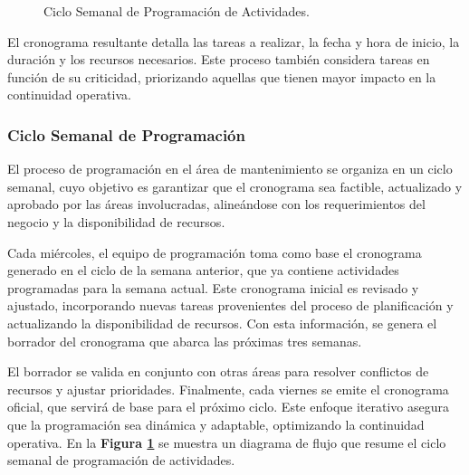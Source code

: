 \documentclass{article}
\begin{document}
\begin{figure}[htbp]
    \centering
    \caption{Ciclo Semanal de Programación de Actividades.}
    \label{fig:flowchart}
\end{figure}


El cronograma resultante detalla las tareas a realizar, la fecha y hora de inicio, la duración y los recursos necesarios. Este proceso también considera tareas en función de su criticidad, priorizando aquellas que tienen mayor impacto en la continuidad operativa.

\subsubsection{Ciclo Semanal de Programación}

El proceso de programación en el área de mantenimiento se organiza en un ciclo semanal, cuyo objetivo es garantizar que el cronograma sea factible, actualizado y aprobado por las áreas involucradas, alineándose con los requerimientos del negocio y la disponibilidad de recursos.

Cada miércoles, el equipo de programación toma como base el cronograma generado en el ciclo de la semana anterior, que ya contiene actividades programadas para la semana actual. Este cronograma inicial es revisado y ajustado, incorporando nuevas tareas provenientes del proceso de planificación y actualizando la disponibilidad de recursos. Con esta información, se genera el borrador del cronograma que abarca las próximas tres semanas.

El borrador se valida en conjunto con otras áreas para resolver conflictos de recursos y ajustar prioridades. Finalmente, cada viernes se emite el cronograma oficial, que servirá de base para el próximo ciclo. Este enfoque iterativo asegura que la programación sea dinámica y adaptable, optimizando la continuidad operativa. En la \textbf{Figura \ref{fig:flowchart}} se muestra un diagrama de flujo que resume el ciclo semanal de programación de actividades.
\end{document}
